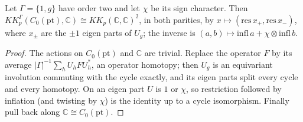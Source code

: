 \begin{proposition}\label{prop:order-two-point-kk-split}
\leanok
Let $\Gamma=\{1,g\}$ have order two and let $\chi$ be its sign character. Then
$KK^\Gamma_p(C_0(\mathrm{pt}),\mathbb C)\cong KK_p(\mathbb C,\mathbb C)^2$, in both
parities, by $x\mapsto(\mathrm{res}\,x_+,\mathrm{res}\,x_-)$, where $x_\pm$ are the
$\pm1$ eigen parts of $U_g$; the inverse is
$(a,b)\mapsto\mathrm{infl}\,a+\chi\otimes\mathrm{infl}\,b$.
\end{proposition}
\begin{proof}
\leanok
The actions on $C_0(\mathrm{pt})$ and $\mathbb C$ are trivial. Replace the operator
$F$ by its average $|\Gamma|^{-1}\sum_h U_hFU_h^*$, an operator homotopy; then $U_g$
is an equivariant involution commuting with the cycle exactly, and its eigen parts
split every cycle and every homotopy. On an eigen part $U$ is $1$ or $\chi$, so restriction followed
by inflation (and twisting by $\chi$) is the identity up to a cycle isomorphism.
Finally pull back along $\mathbb C\cong C_0(\mathrm{pt})$.
\end{proof}

